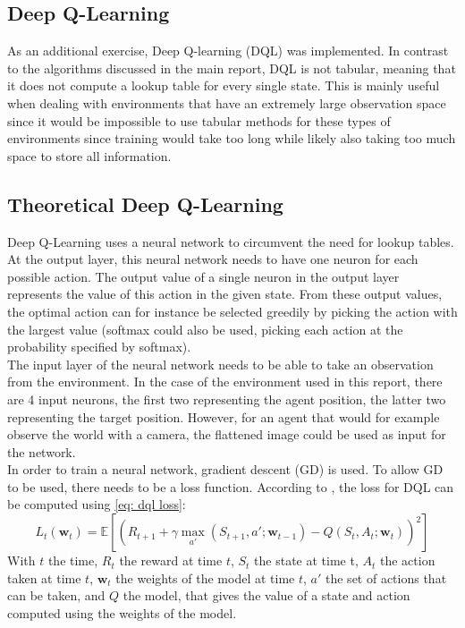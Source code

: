 \documentclass{class}
\begin{document}
\newpage
\begin{appendices}

\section{Deep Q-Learning}
\label{app: deep q-learning}
As an additional exercise, Deep Q-learning (DQL) was implemented. In contrast to the algorithms discussed in the main report, DQL is not tabular, meaning that it does not compute a lookup table for every single state. This is mainly useful when dealing with environments that have an extremely large observation space since it would be impossible to use tabular methods for these types of environments since training would take too long while likely also taking too much space to store all information.

\subsection{Theoretical Deep Q-Learning}
Deep Q-Learning uses a neural network to circumvent the need for lookup tables. At the output layer, this neural network needs to have one neuron for each possible action. The output value of a single neuron in the output layer represents the value of this action in the given state. From these output values, the optimal action can for instance be selected greedily by picking the action with the largest value (softmax could also be used, picking each action at the probability specified by softmax). 
\\[0.3cm]
The input layer of the neural network needs to be able to take an observation from the environment. In the case of the environment used in this report, there are 4 input neurons, the first two representing the agent position, the latter two representing the target position. However, for an agent that would for example observe the world with a camera, the flattened image could be used as input for the network.
\\[0.3cm]
In order to train a neural network, gradient descent (GD) is used. To allow GD to be used, there needs to be a loss function. According to \textcite{lecture6}, the loss for DQL can be computed using \autoref{eq: dql loss}:
\begin{equation}
    \label{eq: dql loss}
    L_t(\mathbf{w}_t) = \mathbb{E}\left[\left(R_{t+1} + \gamma\max_{a'}(S_{t+1}, a';\mathbf{w}_{t-1}) - Q(S_t, A_t;\mathbf{w}_t)\right)^2\right]
\end{equation}
With $t$ the time, $R_t$ the reward at time $t$, $S_t$ the state at time t, $A_t$ the action taken at time $t$, $\mathbf{w}_t$ the weights of the model at time $t$, $a'$ the set of actions that can be taken, and $Q$ the model, that gives the value of a state and action computed using the weights of the model.


\end{appendices}
\end{document}
